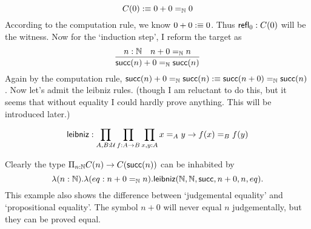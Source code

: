 $$
    C(0) :\equiv 0 + 0 =_{\mathbb{N}} 0
$$
According to the computation rule, we know $0 + 0:\equiv 0$. Thus
$\text{\sf refl}_0: C(0)$ will be the witness. Now for the `induction step',
I reform the target as
$$
\infer{\succn(n) + 0 =_\nat \succn(n)}{n:\nat & n+0=_\nat n}
$$
Again by the computation rule, 
$\text{\sf succ}(n) + 0 =_{\mathbb{N}} \text{\sf succ}(n):\equiv \text{\sf succ}(n+0)=_{\mathbb{N}}\text{\sf succ}(n)$. 
Now let's admit the leibniz rules. (though I am reluctant to do this, 
but it seems that without equality I could hardly prove anything. 
This will be introduced later.)

\begin{definition}
    \label{leibniz}
    $$
    \text{\sf leibniz}: \prod_{A,B:\mathcal{U}}\prod_{f:A\to B}\prod_{x,y:A}
        x=_Ay\to f(x)=_Bf(y)
    $$ 
\end{definition}
Clearly the type $\Pi_{n:\mathbb{N}}C(n)\to C(\text{\sf succ}(n))$ can be inhabited by
$$
    \lambda (n:\mathbb{N}).\lambda (eq:n+0=_{\mathbb{N}} n). \text{\sf leibniz}
    (\mathbb{N},\mathbb{N},\text{\sf succ},n+0,n,eq). 
$$
This example also shows the difference between `judgemental equality' 
and `propositional equality'. The symbol $n+0$ will never equal $n$
judgementally, but they can be proved equal. 

